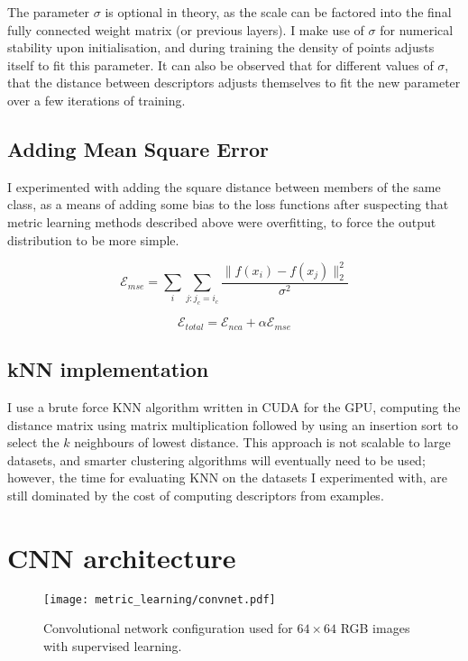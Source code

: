 The parameter $ \sigma $ is optional in theory, as the scale can be factored into the final fully connected weight matrix (or previous layers).  I make use of $ \sigma $ for numerical stability upon initialisation, and during training the density of points adjusts itself to fit this parameter. It can also be observed that for different values of $ \sigma $, that the distance between descriptors adjusts themselves to fit the new parameter over a few iterations of training.


\subsection {Adding Mean Square Error}

I experimented with adding the square distance between members of the same class, as a means of adding some bias to the loss functions after suspecting that metric learning methods described above were overfitting, to force the output distribution to be more simple. 

\begin{equation}
\label{eqn:mse}
\mathcal{E}_{mse} = \sum_i{ \sum_{j:j_c = i_c}  \frac {{\lVert f(x_i) - f(x_j) \rVert^2_2}} {\sigma^2} }
\end{equation}

\begin{equation}
\label{eqn:mse_total}
\mathcal{E}_{total} =  \mathcal{E}_{nca} + \alpha \mathcal{E}_{mse}
\end{equation}


\subsection {kNN implementation}

I use a brute force \gls{KNN} algorithm written in CUDA \cite{Garcia2008} for the \gls{GPU}, computing the distance matrix using matrix multiplication followed by using an insertion sort to select the $ k $ neighbours of lowest distance. This approach is not scalable to large datasets, and smarter clustering algorithms will eventually need to be used; however, the time for evaluating \gls{KNN} on the datasets I experimented with, are still dominated by the cost of computing descriptors from examples. 


\section {CNN architecture}


\begin{figure}[ht]
\centering
\texttt{[image: metric\_learning/convnet.pdf]}
\caption{Convolutional network configuration used for $64\times64$ RGB images with supervised learning.}
\label{fig:metric_convnet}
\end{figure}

